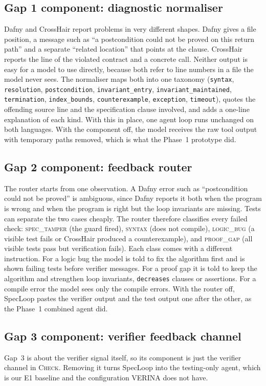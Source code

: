 \subsection{Gap 1 component: diagnostic normaliser}
Dafny and CrossHair report problems in very different shapes. Dafny gives a file position, a message such as ``a postcondition could not be proved on this return path'' and a separate ``related location'' that points at the clause. CrossHair reports the line of the violated contract and a concrete call. Neither output is easy for a model to use directly, because both refer to line numbers in a file the model never sees. The normaliser maps both into one taxonomy (\texttt{syntax}, \texttt{resolution}, \texttt{postcondition}, \texttt{invariant\_entry}, \texttt{invariant\_maintained}, \texttt{termination}, \texttt{index\_bounds}, \texttt{counterexample}, \texttt{exception}, \texttt{timeout}), quotes the offending source line and the specification clause involved, and adds a one-line explanation of each kind. With this in place, one agent loop runs unchanged on both languages. With the component off, the model receives the raw tool output with temporary paths removed, which is what the Phase~1 prototype did.

\subsection{Gap 2 component: feedback router}
The router starts from one observation. A Dafny error such as ``postcondition could not be proved'' is ambiguous, since Dafny reports it both when the program is wrong and when the program is right but the loop invariants are missing. Tests can separate the two cases cheaply. The router therefore classifies every failed check:
\textsc{spec\_tamper} (the guard fired), \textsc{syntax} (does not compile), \textsc{logic\_bug} (a visible test fails or CrossHair produced a counterexample), and \textsc{proof\_gap} (all visible tests pass but verification fails). Each class comes with a different instruction. For a logic bug the model is told to fix the algorithm first and is shown failing tests before verifier messages. For a proof gap it is told to keep the algorithm and strengthen loop invariants, \texttt{decreases} clauses or assertions. For a compile error the model sees only the compile errors. With the router off, SpecLoop pastes the verifier output and the test output one after the other, as the Phase~1 combined agent did.

\subsection{Gap 3 component: verifier feedback channel}
Gap~3 is about the verifier signal itself, so its component is just the verifier channel in \textsc{Check}. Removing it turns SpecLoop into the testing-only agent, which is our E1 baseline and the configuration VERINA does not have.

